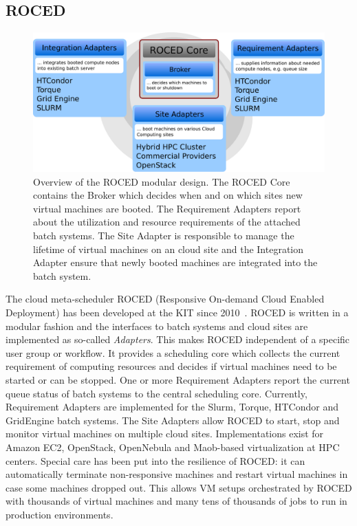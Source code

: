 \subsection{ROCED}
\begin{figure}
\begin{center}
  \includegraphics[width=0.9\linewidth]{figures/roced_design_flat.pdf}
  \caption{Overview of the ROCED modular design. The ROCED Core contains the Broker which decides when and on which sites new virtual machines are booted. The Requirement Adapters report about the utilization and resource requirements of the attached batch systems. The Site Adapter is responsible to manage the lifetime of virtual machines on an cloud site and the Integration Adapter ensure that newly booted machines are integrated into the batch system.}
  \label{fig-frplots}
\end{center}
\end{figure}

The cloud meta-scheduler ROCED (Responsive On-demand Cloud Enabled Deployment) has been developed at the KIT since 2010~\cite{ROCED}. ROCED is written in a modular
fashion and the interfaces to batch systems and cloud sites are implemented as so-called \textit{Adapters}. This makes ROCED independent of a specific user group or workflow. It provides a scheduling core which collects the current requirement of computing resources and decides if virtual machines need to be started or can be stopped. One or more Requirement Adapters report the current queue status of batch systems to the central scheduling core. Currently, Requirement Adapters are implemented for the Slurm, Torque, HTCondor and GridEngine batch systems. The Site Adapters allow ROCED to start, stop and monitor virtual machines on multiple cloud sites. Implementations exist for Amazon EC2, OpenStack, OpenNebula and Maob-based virtualization at HPC centers. Special care has been put into the resilience of ROCED: it can automatically terminate non-responsive machines and restart virtual machines in case some machines dropped out. This allows VM setups orchestrated by ROCED with thousands of virtual machines and many tens of thousands of jobs to run in production environments.


